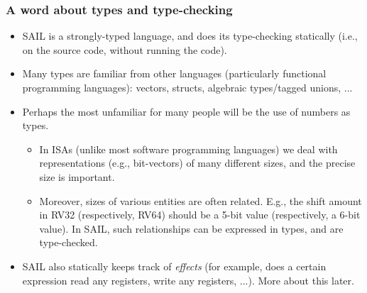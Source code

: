 \documentclass[aspectratio=169]{beamer}
\newcommand{\slidefont}{\scriptsize}
\begin{document}

\begin{frame}[fragile]
  \frametitle{A word about types and type-checking}

  
  \begin{itemize}\slidefont

    \item SAIL is a strongly-typed language, and does its
      type-checking statically (i.e., on the source code, without
      running the code).

    \item Many types are familiar from other languages (particularly
      functional programming languages): vectors, structs, algebraic
      types/tagged unions, ...

    \item Perhaps the most unfamiliar for many people will be the use
      of numbers as types.

      \begin{itemize}\slidefont

        \item In ISAs (unlike most software programming languages) we
          deal with representations (e.g., bit-vectors) of many
          different sizes, and the precise size is important.

        \item Moreover, sizes of various entities are often related.
          E.g., the shift amount in RV32 (respectively, RV64) should
          be a 5-bit value (respectively, a 6-bit value).  In SAIL,
          such relationships can be expressed in types, and are
          type-checked.

      \end{itemize}

    \item SAIL also statically keeps track of \emph{effects} (for
      example, does a certain expression read any registers, write any
      registers, ...).  More about this later.

  \end{itemize}

\end{frame}

\end{document}
